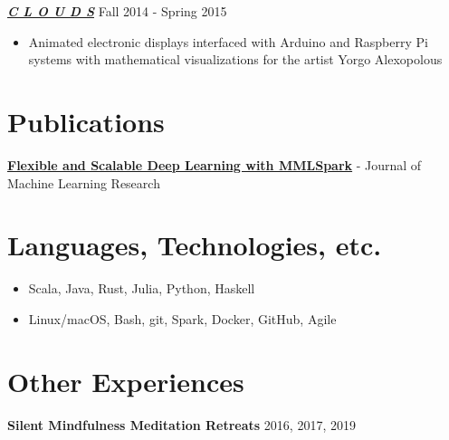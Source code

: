 \documentclass[overlapped]{res}
\begin{document}
\begin{resume}
    \href{https://www.yorgo.org/artworks/clouds}{\underline{\bf {\em C L O U D S\/}}} \hfill Fall 2014 - Spring 2015
    \begin{itemize} \itemsep-2pt
        \item Animated electronic displays interfaced with Arduino and Raspberry Pi systems with mathematical visualizations for the artist Yorgo Alexopolous
    \end{itemize}


    \section{Publications}
        {\bf \href{https://arxiv.org/pdf/1804.04031.pdf}{\underline{Flexible and Scalable Deep Learning with MMLSpark}}} - Journal of Machine Learning Research

    \section{Languages, Technologies, etc.}
    \begin{itemize} \itemsep-2pt
        \item
            Scala, Java, Rust, Julia, Python, Haskell
        \item
            Linux/macOS, Bash, git, Spark, Docker, GitHub, Agile
    \end{itemize}

    \section{Other Experiences}

    {\bf Silent Mindfulness Meditation Retreats} \hfill 2016, 2017, 2019

\end{resume}
\end{document}
